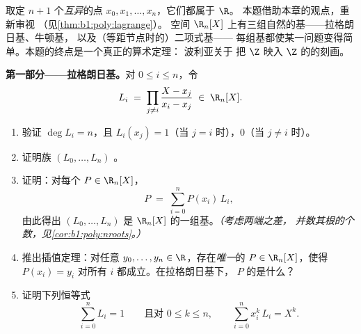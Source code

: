 \begin{problem}\label{pb:b1:vspaces:1}
取定 $n + 1$ 个\emph{互异}的点 $x_0, x_1, \dots, x_n$，它们都属于 $\R$。
本题借助本章的观点，重新审视
（见\cref{thm:b1:poly:lagrange}）。
空间 $\R_n[X]$ 上有三组自然的基——拉格朗日基、牛顿基，
以及（等距节点时的）二项式基——
每组基都使某一问题变得简单。本题的终点是一个真正的算术定理：
波利亚关于
把 $\Z$ 映入 $\Z$ 的的刻画。

\medskip
\noindent\textbf{第一部分——拉格朗日基。}对 $0 \leq i
\leq n$，令
\[
L_i \;=\; \prod_{j \neq i} \frac{X - x_j}{x_i - x_j} \;\in\;
\R_n[X].
\]
\begin{enumerate}
  \item 验证 $\deg L_i = n$，且 $L_i(x_j) = 1$（当 $j =
        i$ 时），$0$（当 $j \neq i$ 时）。
  \item 证明族 $(L_0, \dots, L_n)$ 。
  \item 证明：对每个 $P \in \R_n[X]$，
        \[
        P \;=\; \sum_{i=0}^{n} P(x_i)\, L_i ,
        \]
        由此得出 $(L_0, \dots, L_n)$ 是
        $\R_n[X]$ 的一组基。\emph{（考虑两端之差，
        并数其根的个数，见\cref{cor:b1:poly:nroots}。）}
  \item 推出插值定理：对任意 $y_0,
        \dots, y_n \in \R$，存在\emph{唯一}的 $P \in
        \R_n[X]$，使得 $P(x_i) = y_i$ 对所有 $i$ 都成立。在拉格朗日基下，
         $P$ 的是什么？
  \item 证明下列恒等式
        \[
        \sum_{i=0}^{n} L_i = 1
        \qquad\text{且对 } 0 \leq k \leq n,\qquad
        \sum_{i=0}^{n} x_i^{k}\, L_i = X^{k} .
        \]
\end{enumerate}


\end{problem}
